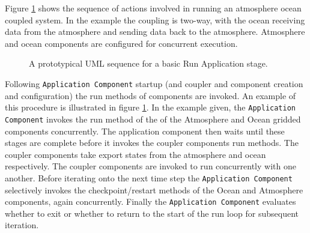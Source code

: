 Figure \ref{fig:RunApplicationDiagram} shows the sequence of actions involved
in running an atmosphere ocean coupled system. In the example the
coupling is two-way, with the ocean receiving data from the atmosphere and 
sending data back to the atmosphere.  Atmosphere and ocean components are 
configured for concurrent execution.

\begin{figure}
\caption[{Basic Run Application}]{A prototypical UML sequence for a basic Run Application stage.\\}
\label{fig:RunApplicationDiagram}
\end{figure}

Following {\tt Application Component} startup (and coupler and component
creation and configuration) the run methods of components are 
invoked. An example of this procedure is illustrated in figure 
\ref{fig:RunApplicationDiagram}. In 
the example given, the {\tt Application Component} invokes the run method of 
the of the Atmosphere and Ocean gridded components concurrently. The 
application 
component then waits until these stages are complete before it invokes the 
coupler components run methods. The coupler components
take export states from the atmosphere and ocean respectively. 
The coupler components are invoked to run concurrently with one another. Before iterating 
onto the next time step the {\tt Application Component} selectively invokes the 
checkpoint/restart methods of the Ocean and Atmosphere components, again 
concurrently. Finally the {\tt Application Component} evaluates whether
to exit or whether to return to the start of the run loop for subsequent 
iteration.

